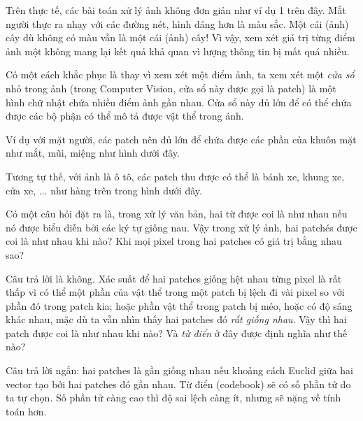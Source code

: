Trên thực tế, các bài toán xử lý ảnh không đơn giản như ví dụ 1 trên đây. Mắt người thực ra nhạy với các đường nét, hình dáng hơn là màu sắc. Một cái (ảnh) cây dù không có màu vẫn là một cái (ảnh) cây! Vì vậy, xem xét giá trị từng điểm ảnh một không mang lại kết quả khả quan vì lượng thông tin bị mất quá nhiều.  
 
Có một cách khắc phục là thay vì xem xét một điểm ảnh, ta xem xét một \textit{cửa sổ} nhỏ trong ảnh (trong Computer Vision, cửa sổ này được gọi là patch) là một hình chữ nhật chứa nhiều điểm ảnh gần nhau. Cửa sổ này đủ lớn để có thể chứa được các bộ phận có thể mô tả được vật thể trong ảnh.  
 
Ví dụ với mặt người, các patch nên đủ lớn để chứa được các phần của khuôn mặt như mắt, mũi, miệng như hình dưới đây.  
 
 
Tương tự thế, với ảnh là ô tô, các patch thu được có thể là bánh xe, khung xe, cửa xe, ... như hàng trên trong hình dưới đây.  
 
 
Có một câu hỏi đặt ra là, trong xử lý văn bản, hai từ được coi là như nhau nếu nó được biểu diễn bởi các ký tự giống nau. Vậy trong xử lý ảnh, hai patchés được coi là như nhau khi nào? Khi mọi pixel trong hai patches có giá trị bằng nhau sao?  
 
Câu trả lời là không. Xác suất để hai patches giống hệt nhau từng pixel là rất thấp vì có thể một phần của vật thể trong một patch bị lệch đi vài pixel so với phần đó trong patch kia; hoặc phần vật thể trong patch bị méo, hoặc có độ sáng khác nhau, mặc dù ta vẫn nhìn thấy hai patches đó \textit{rất giống nhau}. Vậy thì hai patch được coi là như nhau khi nào? Và \textit{từ điển} ở đây được định nghĩa như thế nào?  
 
Câu trả lời ngắn: hai patches là gần giống nhau nếu khoảng cách Euclid giữa hai vector tạo bởi hai patches đó gần nhau. Từ điển (codebook) sẽ có số phần tử do ta tự chọn. Số phần tử càng cao thì độ sai lệch càng ít, nhưng sẽ nặng về tính toán hơn.  
 
